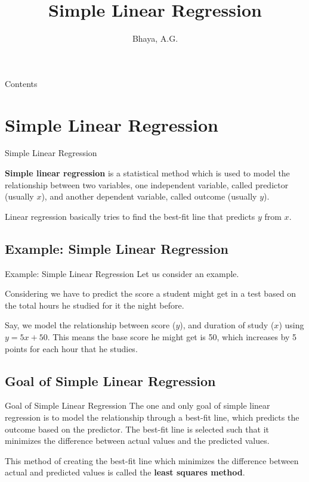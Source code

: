 \documentclass[pdf]{beamer}
\title{Simple Linear Regression}
\author[Bhaya, A.G.]{Bhaya, A.G.}
\begin{document}
    \begin{frame}
        \maketitle
    \end{frame}

    \begin{frame}{Contents}
        \tableofcontents
    \end{frame}

    \section{Simple Linear Regression}
    \begin{frame}{Simple Linear Regression}
        \begin{definition}
            \textbf{Simple linear regression} is a statistical method which is used to model the relationship between two variables, one independent variable, called predictor (usually \(x\)), and another dependent variable, called outcome (usually \(y\)).
        \end{definition}

        Linear regression basically tries to find the best-fit line that predicts \(y\) from \(x\).
    \end{frame}

    \subsection{Example: Simple Linear Regression}
    \begin{frame}{Example: Simple Linear Regression}
        Let us consider an example.

        \begin{example}
            Considering we have to predict the score a student might get in a test based on the total hours he studied for it the night before.
        \end{example}

        Say, we model the relationship between score (\(y\)), and duration of study (\(x\)) using \(y=5x+50\). This means the base score he might get is 50, which increases by 5 points for each hour that he studies.
    \end{frame}

    \subsection{Goal of Simple Linear Regression}
    \begin{frame}{Goal of Simple Linear Regression}
        The one and only goal of simple linear regression is to model the relationship through a best-fit line, which predicts the outcome based on the predictor. The best-fit line is selected such that it minimizes the difference between actual values and the predicted values.

        This method of creating the best-fit line which minimizes the difference between actual and predicted values is called the \textbf{least squares method}.
    \end{frame}
\end{document}
